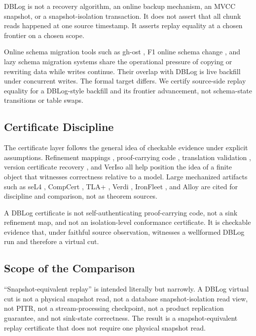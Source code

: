 \documentclass[letterpaper,10pt,twocolumn]{article}
\begin{document}
DBLog is not a recovery algorithm, an online backup mechanism, an MVCC
snapshot, or a snapshot-isolation transaction. It does not assert that
all chunk reads happened at one source timestamp. It asserts replay
equality at a chosen frontier on a chosen scope.

Online schema migration tools such as gh-ost \citep{ghost2016}, F1
online schema change \citep{rae2013f1}, and lazy schema migration
systems \citep{zeng2024slsm} share the operational pressure of copying or
rewriting data while writes continue. Their overlap with DBLog is live
backfill under concurrent writes. The formal target differs. We certify source-side replay equality for a
DBLog-style backfill and its frontier advancement, not
schema-state transitions or table swaps.

\subsection{Certificate Discipline}\label{certificate-discipline}

The certificate layer follows the general idea of checkable evidence
under explicit assumptions. Refinement mappings \citep{abadi1991refinement},
proof-carrying code \citep{necula1997pcc}, translation validation
\citep{pnueli1998translation}, version certificate recovery
\citep{clark2024vcr}, and VerIso \citep{ghasemirad2025veriso} all help
position the idea of a finite object that witnesses correctness relative
to a model. Large mechanized artifacts such as seL4
\citep{klein2009sel4}, CompCert \citep{leroy2009compcert}, TLA+
\citep{lamport2002specifying}, Verdi \citep{wilcox2015verdi}, IronFleet
\citep{hawblitzel2015ironfleet}, and Alloy \citep{jackson2002alloy} are
cited for discipline and comparison, not as theorem sources.

A DBLog certificate is not self-authenticating proof-carrying code, not
a sink refinement map, and not an isolation-level conformance
certificate. It is checkable evidence that, under faithful source
observation, witnesses a wellformed DBLog run and therefore a virtual
cut.

\subsection{Scope of the Comparison}\label{title-promise-and-product-claim-boundaries}

``Snapshot-equivalent replay'' is intended literally but narrowly. A
DBLog virtual cut is not a physical snapshot read, not a database
snapshot-isolation read view, not PITR, not a stream-processing
checkpoint, not a product replication guarantee, and not sink-state
correctness. The result is a snapshot-equivalent replay certificate that
does not require one physical snapshot read.
\end{document}
